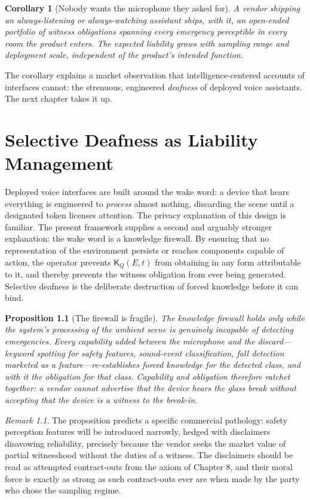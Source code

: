 \documentclass[11pt,oneside]{book}
\theoremstyle{plain}
\newtheorem{proposition}[theorem]{Proposition}
\newtheorem{corollary}[theorem]{Corollary}
\theoremstyle{definition}
\theoremstyle{remark}
\newtheorem{remark}[theorem]{Remark}
\newcommand{\Know}{\mathsf{K}}
\begin{document}
\begin{corollary}[Nobody wants the microphone they asked for]
A vendor shipping an always-listening or always-watching assistant ships, with it, an open-ended portfolio of witness obligations spanning every emergency perceptible in every room the product enters. The expected liability grows with sampling range and deployment scale, independent of the product's intended function.
\end{corollary}

The corollary explains a market observation that intelligence-centered accounts of interfaces cannot: the strenuous, engineered \emph{deafness} of deployed voice assistants. The next chapter takes it up.

\chapter{Selective Deafness as Liability Management}

Deployed voice interfaces are built around the wake word: a device that hears everything is engineered to \emph{process} almost nothing, discarding the scene until a designated token licenses attention. The privacy explanation of this design is familiar. The present framework supplies a second and arguably stronger explanation: the wake word is a knowledge firewall. By ensuring that no representation of the environment persists or reaches components capable of action, the operator prevents $\Know_Q(E,t)$ from obtaining in any form attributable to it, and thereby prevents the witness obligation from ever being generated. Selective deafness is the deliberate destruction of forced knowledge before it can bind.

\begin{proposition}[The firewall is fragile]
The knowledge firewall holds only while the system's processing of the ambient scene is genuinely incapable of detecting emergencies. Every capability added between the microphone and the discard---keyword spotting for safety features, sound-event classification, fall detection marketed as a feature---re-establishes forced knowledge for the detected class, and with it the obligation for that class. Capability and obligation therefore ratchet together: a vendor cannot advertise that the device hears the glass break without accepting that the device is a witness to the break-in.
\end{proposition}

\begin{remark}
The proposition predicts a specific commercial pathology: safety perception features will be introduced narrowly, hedged with disclaimers disavowing reliability, precisely because the vendor seeks the market value of partial witnesshood without the duties of a witness. The disclaimers should be read as attempted contract-outs from the axiom of Chapter 8, and their moral force is exactly as strong as such contract-outs ever are when made by the party who chose the sampling regime.
\end{remark}
\end{document}
